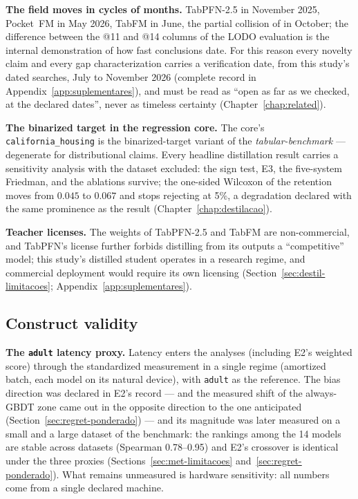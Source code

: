 \textbf{The field moves in cycles of months.} TabPFN-2.5 in
November 2025, Pocket~FM in May 2026, TabFM in June, the partial
collision of \citet{jeong2026} in October; the difference between
the @11 and @14 columns of the LODO evaluation is the internal
demonstration of how fast conclusions date. For this reason every
novelty claim and every gap characterization carries a verification
date, from this study's dated searches, July to November 2026
(complete record in Appendix~\ref{app:suplementares}), and must be
read as ``open as far as we checked, at the declared dates'', never
as timeless certainty (Chapter~\ref{chap:related}).

\textbf{The binarized target in the regression core.} The core's
\texttt{california\_\allowbreak housing} is the binarized-target
variant of the \emph{tabular-benchmark} --- degenerate for
distributional claims. Every headline distillation result carries a
sensitivity analysis with the dataset excluded: the sign test, E3,
the five-system Friedman, and the ablations survive; the one-sided
Wilcoxon of the retention moves from $0.045$ to $0.067$ and stops
rejecting at 5\%, a degradation declared with the same prominence
as the result (Chapter~\ref{chap:destilacao}).

\textbf{Teacher licenses.} The weights of TabPFN-2.5 and TabFM are
non-commercial, and TabPFN's license further forbids distilling
from its outputs a ``competitive'' model; this study's distilled
student operates in a research regime, and commercial deployment
would require its own licensing
(Section~\ref{sec:destil-limitacoes};
Appendix~\ref{app:suplementares}).

\subsection{Construct validity}

\textbf{The \texttt{adult} latency proxy.} Latency enters the
analyses (including E2's weighted score) through the standardized
measurement in a single regime (amortized batch, each model on its
natural device), with \texttt{adult} as the reference. The bias
direction was declared in E2's record --- and the measured shift of
the always-GBDT zone came out in the opposite direction to the one
anticipated (Section~\ref{sec:regret-ponderado}) --- and its magnitude was
later measured on a small and a large dataset of the benchmark: the rankings among
the 14 models are stable across datasets (Spearman 0.78--0.95) and
E2's crossover is identical under the three proxies
(Sections~\ref{sec:met-limitacoes}
and~\ref{sec:regret-ponderado}). What remains unmeasured is
hardware sensitivity: all numbers come from a single declared
machine.

